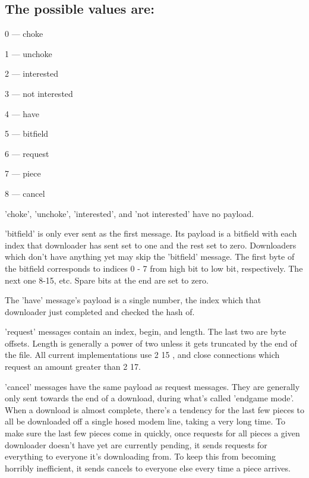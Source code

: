 \documentclass{article}
\begin{document}
{\subsection{The possible values are:}}
{\begin{itemize}
  {\item 0 --- choke}
  {\item 1 --- unchoke}
  {\item 2 --- interested}
  {\item 3 --- not interested}
  {\item 4 --- have}
  {\item 5 --- bitfield}
  {\item 6 --- request}
  {\item 7 --- piece}
  {\item 8 --- cancel}
\end{itemize}}

'choke', 'unchoke', 'interested', and 'not interested' have no payload.

'bitfield' is only ever sent as the first message. Its payload is a bitfield with each index that downloader has sent set to one and the rest set to zero. Downloaders which don't have anything yet may skip the 'bitfield' message. The first byte of the bitfield corresponds to indices 0 - 7 from high bit to low bit, respectively. The next one 8-15, etc. Spare bits at the end are set to zero.

The 'have' message's payload is a single number, the index which that downloader just completed and checked the hash of.

'request' messages contain an index, begin, and length. The last two are byte offsets. Length is generally a power of two unless it gets truncated by the end of the file. All current implementations use 2 15 , and close connections which request an amount greater than 2 17.

'cancel' messages have the same payload as request messages. They are generally only sent towards the end of a download, during what's called 'endgame mode'. When a download is almost complete, there's a tendency for the last few pieces to all be downloaded off a single hosed modem line, taking a very long time. To make sure the last few pieces come in quickly, once requests for all pieces a given downloader doesn't have yet are currently pending, it sends requests for everything to everyone it's downloading from. To keep this from becoming horribly inefficient, it sends cancels to everyone else every time a piece arrives.
\end{document}
